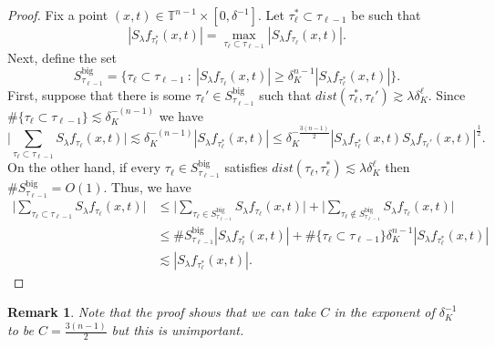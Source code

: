 \documentclass[11pt]{amsart}
\numberwithin{equation}{section}
\newcommand{\Tn}{\mathbb{T}^{n-1}}
\newcommand{\la}{\lambda}
\newcommand{\Sl}{S_{\la}}
\newcommand{\dK}[1]{\delta_{K}^{#1}}
\newtheorem{remark}{Remark}[section]
\begin{document}
\begin{proof}
Fix a point $(x,t) \in \Tn \times [0,\delta^{-1}]$. Let $\tau_{\ell}^{*} \subset \tau_{\ell - 1}$ be such that 
\begin{equation}
    |\Sl f_{\tau_{\ell}^{*}}(x,t)| = \max_{\tau_{\ell} \subset {\tau_{\ell - 1}}} |\Sl f_{\tau_{\ell}}(x,t)|.
\end{equation} 
Next, define the set
\begin{equation}
     S_{\tau_{\ell-1}}^{\text{big}} = \{\tau_{\ell} \subset \tau_{\ell - 1} \ : \ |\Sl f_{\tau_{\ell}}(x,t)| \geq \dK{n-1} |\Sl f_{\tau_{\ell}^{*}}(x,t)|\}.   
\end{equation}
First, suppose that there is some $\tau_{\ell}' \in S_{\tau_{\ell - 1}}^{\text{big}}$ such that $dist(\tau_{\ell}^{*}, \tau_{\ell}') \gtrsim \la \dK{\ell}$. Since $\#\{\tau_{\ell}\subset \tau_{\ell - 1}\} \lesssim \dK{-(n-1)}$ we have
\begin{equation}
    \Big|\sum_{\tau_{\ell} \subset \tau_{\ell - 1}} \Sl f_{\tau_{\ell}}(x,t)\Big| \lesssim \dK{-(n-1)}|\Sl f_{\tau_{\ell}^{*}}(x,t)| \leq \dK{-\frac{3(n-1)}{2}}| \Sl f_{\tau_{\ell}^{*}}(x,t) \Sl f_{\tau_{\ell}'}(x,t)|^{\frac{1}{2}}. 
\end{equation}
On the other hand, if every $\tau_{\ell} \in S_{\tau_{\ell - 1}}^{\text{big}}$ satisfies $dist(\tau_{\ell}, \tau_{\ell}^{*}) \lesssim \la \dK{\ell}$ then $\# S_{\tau_{\ell - 1}}^{\text{big}} = O(1)$. Thus, we have
\begin{equation}
\begin{split}
    \Big| \sum_{\tau_{\ell} \subset \tau_{\ell - 1}} \Sl f_{\tau_{\ell}}(x,t)\Big| &\leq \Big| \sum_{\tau_{\ell} \in S_{\tau_{\ell - 1}}^{\text{big}}} \Sl f_{\tau_{\ell}}(x,t)\Big| + \Big| \sum_{\tau_{\ell} \notin S_{\tau_{\ell - 1}}^{\text{big}}} \Sl f_{\tau_{\ell}}(x,t)\Big| \\
    & \leq \#S_{\tau_{\ell - 1}}^{\text{big}} |\Sl f_{\tau_{\ell}^{*}}(x,t)| + \#\{\tau_{\ell} \subset \tau_{\ell - 1}\} \dK{n-1}|\Sl f_{\tau_{\ell}^{*}}(x,t)| \\
    &\lesssim |\Sl f_{\tau_{\ell}^{*}}(x,t)|.
\end{split}
\end{equation}
\end{proof}
\noindent
\begin{remark}
    Note that the proof shows that we can take $C$ in the exponent of $\dK{-1}$ to be $C = \frac{3(n-1)}{2}$ but this is unimportant.
\end{remark}
\end{document}
